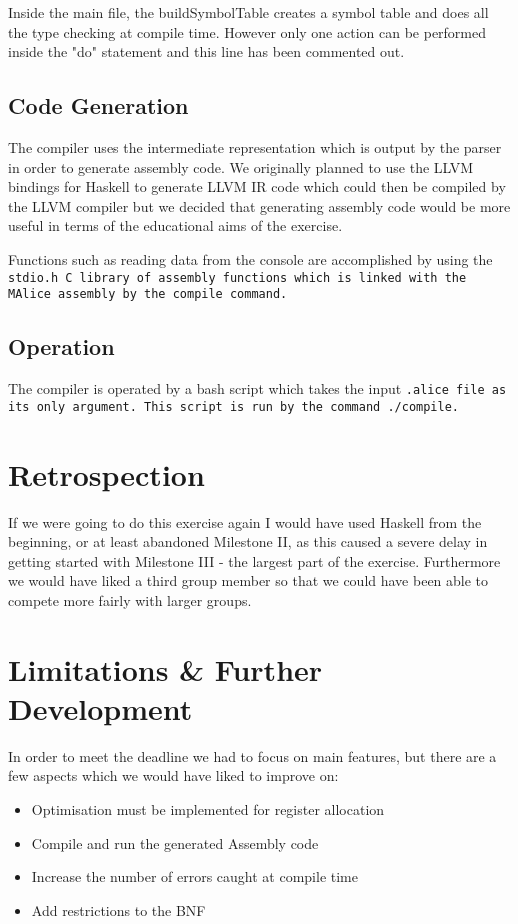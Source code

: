 \documentclass[11pt]{article}
\begin{document}
Inside the main file, the buildSymbolTable creates a symbol table and does all the type checking at compile time. However only one action can be performed inside the "do" statement and this line has been commented out.

\subsection{Code Generation}
The compiler uses the intermediate representation which is output by the parser in order to generate assembly code. We originally planned to use the LLVM bindings for Haskell to generate LLVM IR code which could then be compiled by the LLVM compiler but we decided that generating assembly code would be more useful in terms of the educational aims of the exercise.

Functions such as reading data from the console are accomplished by using the \tt stdio.h \rm C library of assembly functions which is linked with the MAlice assembly by the \tt compile \rm command.

\subsection{Operation}
The compiler is operated by a bash script which takes the input \tt .alice \rm file as its only argument. This script is run by the command \tt ./compile\rm .

\section{Retrospection}
If we were going to do this exercise again I would have used Haskell from the beginning, or at least abandoned Milestone II, as this caused a severe delay in getting started with Milestone III - the largest part of the exercise. Furthermore we would have liked a third group member so that we could have been able to compete more fairly with larger groups.

\section{Limitations \& Further Development}
In order to meet the deadline we had to focus on main features, but there are a few aspects which we would have liked to improve on:

\begin{itemize}
\item Optimisation must be implemented for register allocation
\item Compile and run the generated Assembly code
\item Increase the number of errors caught at compile time
\item Add restrictions to the BNF
\end{itemize}
\end{document}

